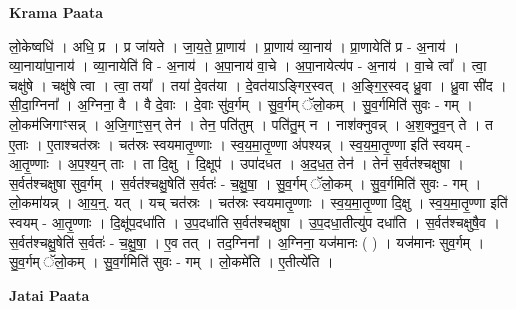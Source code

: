 \documentclass[17pt]{extarticle}
\begin{document}
\textbf{Krama Paata} \newline

लो॒केष्वधि॑ । अधि॒ प्र । प्र जा॑यते । जा॒य॒ते॒ प्रा॒णाय॑ । प्रा॒णाय॑ व्या॒नाय॑ । प्रा॒णायेति॑ प्र - अ॒नाय॑ । व्या॒नाया॑पा॒नाय॑ । व्या॒नायेति॑ वि - अ॒नाय॑ । अ॒पा॒नाय॑ वा॒चे । अ॒पा॒नायेत्य॑प - अ॒नाय॑ । वा॒चे त्वा᳚ । त्वा॒ चक्षु॑षे । चक्षु॑षे त्वा । त्वा॒ तया᳚ । तया॑ दे॒वत॑या । दे॒वत॑याऽङ्गिर॒स्वत् । अ॒ङ्गि॒र॒स्वद् ध्रु॒वा । ध्रु॒वा सी॑द । सी॒दा॒ग्निना᳚ । अ॒ग्निना॒ वै । वै दे॒वाः । दे॒वाः सु॑व॒र्गम् । सु॒व॒र्गम् ॅलो॒कम् । सु॒व॒र्गमिति॑ सुवः - गम् । लो॒कम॑जिगाꣳसन्न् । अ॒जि॒गाꣳ॒॒स॒न् तेन॑ । तेन॒ पति॑तुम् । पति॑तु॒म् न । नाश॑क्नुवन्न् । अ॒श॒क्नु॒व॒न् ते । त ए॒ताः । ए॒ताश्चत॑स्रः । चत॑स्रः स्वयमातृ॒ण्णाः । स्व॒य॒मा॒तृ॒ण्णा अ॑पश्यन्न् । स्व॒य॒मा॒तृ॒ण्णा इति॑ स्वयम् - आ॒तृ॒ण्णाः । अ॒प॒श्य॒न् ताः । ता दि॒क्षु । दि॒क्षूप॑ । उपा॑दधत । अ॒द॒ध॒त॒ तेन॑ । तेन॑ स॒र्वत॑श्चक्षुषा । स॒र्वत॑श्चक्षुषा सुव॒र्गम् । स॒र्वत॑श्चक्षु॒षेति॑ स॒र्वतः॑ - च॒क्षु॒षा॒ । सु॒व॒र्गम् ॅलो॒कम् । सु॒व॒र्गमिति॑ सुवः - गम् । लो॒कमा॑यन्न् । आ॒य॒न्॒. यत् । यच् चत॑स्रः । चत॑स्रः स्वयमातृ॒ण्णाः । स्व॒य॒मा॒तृ॒ण्णा दि॒क्षु । स्व॒य॒मा॒तृ॒ण्णा इति॑ स्वयम् - आ॒तृ॒ण्णाः । दि॒क्षू॑प॒दधा॑ति । उ॒प॒दधा॑ति स॒र्वत॑श्चक्षुषा । उ॒प॒दधा॒तीत्यु॑प दधा॑ति । स॒र्वत॑श्चक्षुषै॒व । स॒र्वत॑श्चक्षु॒षेति॑ स॒र्वतः॑ - च॒क्षु॒षा॒ । ए॒व तत् । तद॒ग्निना᳚ । अ॒ग्निना॒ यज॑मानः ( ) । यज॑मानः सुव॒र्गम् । सु॒व॒र्गम् ॅलो॒कम् । सु॒व॒र्गमिति॑ सुवः - गम् । लो॒कमे॑ति । ए॒तीत्ये॑ति । \newline

\textbf{Jatai Paata} \newline
\end{document}
